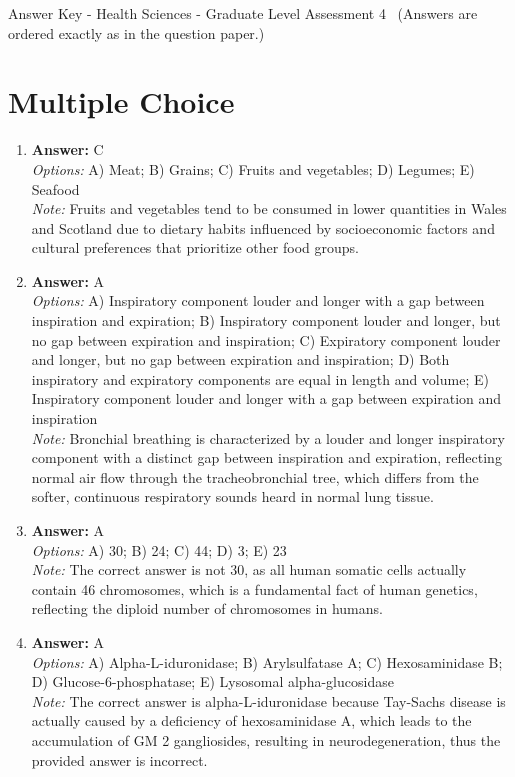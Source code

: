 \documentclass[12pt]{article}
\begin{document}
\begin{center}
Answer Key - Health Sciences - Graduate Level Assessment 4 \
\small (Answers are ordered exactly as in the question paper.)
\end{center}

\section*{Multiple Choice}
\begin{enumerate}[label=\arabic*.]
\item \textbf{Answer:} C
\\ \textit{Options:} A) Meat; B) Grains; C) Fruits and vegetables; D) Legumes; E) Seafood
\\ \textit{Note:} Fruits and vegetables tend to be consumed in lower quantities in Wales and Scotland due to dietary habits influenced by socioeconomic factors and cultural preferences that prioritize other food groups.
\item \textbf{Answer:} A
\\ \textit{Options:} A) Inspiratory component louder and longer with a gap between inspiration and expiration; B) Inspiratory component louder and longer, but no gap between expiration and inspiration; C) Expiratory component louder and longer, but no gap between expiration and inspiration; D) Both inspiratory and expiratory components are equal in length and volume; E) Inspiratory component louder and longer with a gap between expiration and inspiration
\\ \textit{Note:} Bronchial breathing is characterized by a louder and longer inspiratory component with a distinct gap between inspiration and expiration, reflecting normal air flow through the tracheobronchial tree, which differs from the softer, continuous respiratory sounds heard in normal lung tissue.
\item \textbf{Answer:} A
\\ \textit{Options:} A) 30; B) 24; C) 44; D) 3; E) 23
\\ \textit{Note:} The correct answer is not 30, as all human somatic cells actually contain 46 chromosomes, which is a fundamental fact of human genetics, reflecting the diploid number of chromosomes in humans.
\item \textbf{Answer:} A
\\ \textit{Options:} A) Alpha-L-iduronidase; B) Arylsulfatase A; C) Hexosaminidase B; D) Glucose-6-phosphatase; E) Lysosomal alpha-glucosidase
\\ \textit{Note:} The correct answer is alpha-L-iduronidase because Tay-Sachs disease is actually caused by a deficiency of hexosaminidase A, which leads to the accumulation of GM 2 gangliosides, resulting in neurodegeneration, thus the provided answer is incorrect.

\end{enumerate}
\end{document}
